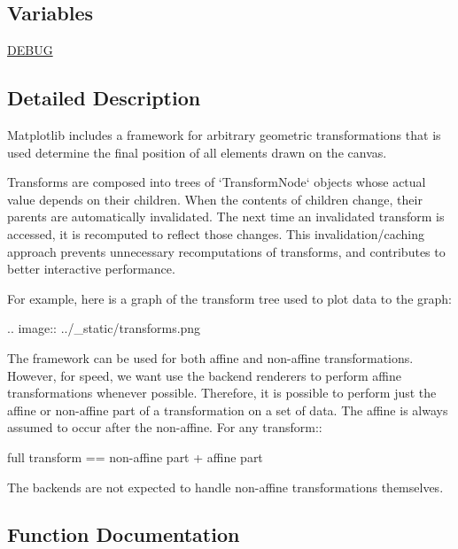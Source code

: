 \subsection*{Variables}
\begin{DoxyCompactItemize}
\item 
\hyperlink{namespacematplotlib_1_1transforms_ac94acdc432ebaea39ea805f68cda4261}{D\+E\+B\+UG}
\end{DoxyCompactItemize}


\subsection{Detailed Description}
\begin{DoxyVerb}Matplotlib includes a framework for arbitrary geometric
transformations that is used determine the final position of all
elements drawn on the canvas.

Transforms are composed into trees of `TransformNode` objects
whose actual value depends on their children.  When the contents of
children change, their parents are automatically invalidated.  The
next time an invalidated transform is accessed, it is recomputed to
reflect those changes.  This invalidation/caching approach prevents
unnecessary recomputations of transforms, and contributes to better
interactive performance.

For example, here is a graph of the transform tree used to plot data
to the graph:

.. image:: ../_static/transforms.png

The framework can be used for both affine and non-affine
transformations.  However, for speed, we want use the backend
renderers to perform affine transformations whenever possible.
Therefore, it is possible to perform just the affine or non-affine
part of a transformation on a set of data.  The affine is always
assumed to occur after the non-affine.  For any transform::

  full transform == non-affine part + affine part

The backends are not expected to handle non-affine transformations
themselves.
\end{DoxyVerb}
 

\subsection{Function Documentation}
\mbox{\label{namespacematplotlib_1_1transforms_ab613558a411c61e719e4a7f8d9679e86}} 
